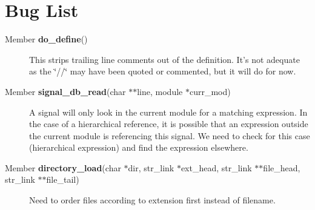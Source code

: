\section{Bug List}\label{bug}
\begin{description}
\item[\label{_bug000001}
Member {\bf do\_\-define}() ]
This strips trailing line comments out of the definition. It's not adequate as the \char`\"{}//\char`\"{} may have been quoted or commented, but it will do for now.\end{description}


\begin{description}
\item[\label{_bug000002}
Member {\bf signal\_\-db\_\-read}(char $\ast$$\ast$line, module $\ast$curr\_\-mod) ]
A signal will only look in the current module for a matching expression. In the case of a hierarchical reference, it is possible that an expression outside the current module is referencing this signal. We need to check for this case (hierarchical expression) and find the expression elsewhere.\end{description}


\begin{description}
\item[\label{_bug000003}
Member {\bf directory\_\-load}(char $\ast$dir, str\_\-link $\ast$ext\_\-head, str\_\-link $\ast$$\ast$file\_\-head, str\_\-link $\ast$$\ast$file\_\-tail) ]
Need to order files according to extension first instead of filename.\end{description}
 